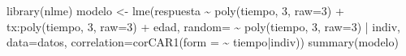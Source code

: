 \documentclass[
]{book}
\newenvironment{Shaded}{\begin{snugshade}}{\end{snugshade}}
\newcommand{\AttributeTok}[1]{\textcolor[rgb]{0.77,0.63,0.00}{#1}}
\newcommand{\DecValTok}[1]{\textcolor[rgb]{0.00,0.00,0.81}{#1}}
\newcommand{\FunctionTok}[1]{\textcolor[rgb]{0.00,0.00,0.00}{#1}}
\newcommand{\NormalTok}[1]{#1}
\newcommand{\OtherTok}[1]{\textcolor[rgb]{0.56,0.35,0.01}{#1}}
\newcommand{\SpecialCharTok}[1]{\textcolor[rgb]{0.00,0.00,0.00}{#1}}
\begin{document}
\begin{Shaded}
\begin{Highlighting}[]
\FunctionTok{library}\NormalTok{(nlme)}
\NormalTok{modelo }\OtherTok{\textless{}{-}} \FunctionTok{lme}\NormalTok{(respuesta }\SpecialCharTok{\textasciitilde{}} \FunctionTok{poly}\NormalTok{(tiempo, }\DecValTok{3}\NormalTok{, }\AttributeTok{raw=}\DecValTok{3}\NormalTok{) }\SpecialCharTok{+}\NormalTok{ tx}\SpecialCharTok{:}\FunctionTok{poly}\NormalTok{(tiempo, }\DecValTok{3}\NormalTok{, }\AttributeTok{raw=}\DecValTok{3}\NormalTok{) }\SpecialCharTok{+}\NormalTok{ edad,}
              \AttributeTok{random=} \SpecialCharTok{\textasciitilde{}} \FunctionTok{poly}\NormalTok{(tiempo, }\DecValTok{3}\NormalTok{, }\AttributeTok{raw=}\DecValTok{3}\NormalTok{)  }\SpecialCharTok{|}\NormalTok{ indiv, }
              \AttributeTok{data=}\NormalTok{datos, }
              \AttributeTok{correlation=}\FunctionTok{corCAR1}\NormalTok{(}\AttributeTok{form =} \SpecialCharTok{\textasciitilde{}}\NormalTok{ tiempo}\SpecialCharTok{|}\NormalTok{indiv))}
\FunctionTok{summary}\NormalTok{(modelo)}
\end{Highlighting}
\end{Shaded}
\end{document}

